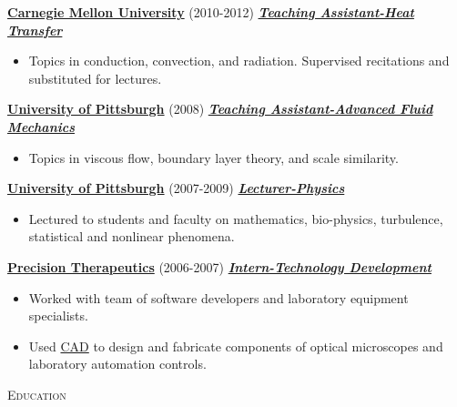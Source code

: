 \documentclass{article}
\newcommand{\lineunder}{\vspace*{-8pt} \\ \hspace*{-18pt} \hrulefill \\}
\newcommand{\header}[1]{{\hspace*{-15pt}\vspace*{6pt} \textsc{#1}} \vspace*{-6pt} \lineunder}
\newcommand{\employer}[3]{{ \textbf{#1} (#2) \underline{\textbf{\emph{#3}}}\\  }}
\newenvironment{achievements}{\begin{list}{$\bullet$}{\topsep 0pt \itemsep -2pt}}{\vspace*{4pt}\end{list}}
\begin{document}

\employer{\href{https://www.cmu.edu/me/}{Carnegie Mellon University}}{2010-2012}{Teaching Assistant-Heat Transfer}
  \begin{itemize}[leftmargin=*]
    \item Topics in conduction, convection, and radiation. Supervised recitations and substituted for lectures. 
  \end{itemize}

\employer{\href{http://www.engineering.pitt.edu/MEMS/}{University of Pittsburgh}}{2008}{Teaching Assistant-Advanced Fluid Mechanics}
  \begin{itemize}[leftmargin=*]
    \item Topics in viscous flow, boundary layer theory, and scale similarity. 
  \end{itemize}

\employer{\href{http://www.physicsandastronomy.pitt.edu/}{University of Pittsburgh}}{2007-2009}{Lecturer-Physics}
  \begin{itemize}[leftmargin=*]
    \item Lectured to students and faculty on mathematics, bio-physics, turbulence, statistical and nonlinear phenomena. 
  \end{itemize}

\employer{\href{http://www.precisiontherapeutics.com/}{Precision Therapeutics}}{2006-2007}{Intern-Technology Development}
  \begin{itemize}[leftmargin=*]
    \item Worked with team of software developers and laboratory equipment specialists.
    \item Used \href{http://en.wikipedia.org/wiki/Computer-aided_design}{CAD} to design and fabricate components of optical microscopes and laboratory automation controls. 
  \end{itemize}

\header{Education}
\end{document}
